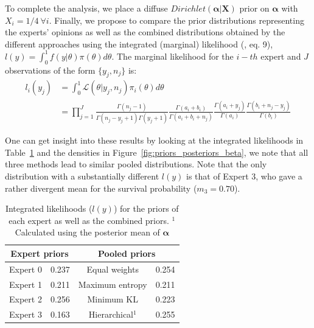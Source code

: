 \documentclass[a4paper, notitlepage, 10pt]{article}
\begin{document}

To complete the analysis, we place a diffuse $Dirichlet(\boldsymbol\alpha | \boldsymbol X)$ prior on $\boldsymbol\alpha$ with $X_i = 1/4 \: \forall i$.
Finally, we propose to compare the prior distributions representing the experts' opinions as well as the combined distributions obtained by the different approaches using the integrated (marginal) likelihood (\cite{raftery2007}, eq. 9), $l(y) = \int_{0}^{1}f(y|\theta)\pi(\theta)d\theta$.
The marginal likelihood for the $i-th$ expert and $J$ observations of the form $\{ y_j, n_j\}$ is:
\begin{align}
  \label{eq:marglike}
l_i(y_j) &= \int_{0}^{1}\mathcal{L}(\theta|y_j, n_j)\pi_i(\theta)d\theta\nonumber\\
 &= \prod_{j = 1}^{J}\frac{\Gamma(n_j-1)}{\Gamma(n_j-y_j + 1)\Gamma(y_j+1)}\frac{\Gamma(a_i + b_i)}{\Gamma(a_i + b_i + n_j)}\frac{\Gamma(a_i + y_j)}{\Gamma(a_i)}\frac{\Gamma(b_i + n_j - y_j) }{\Gamma(b_i)}
 \end{align}

One can get insight into these results by looking at the integrated likelihoods in Table~\ref{tab:marglikes} and the densities in Figure~\ref{fig:priors_posteriors_beta}, we note that all three methods lead  to similar pooled distributions.
Note that the only distribution with a substantially different $l(y)$ is that of Expert 3, who gave a rather divergent mean for the survival probability ($m_3=0.70$).

\begin{table}[ht]
\caption{Integrated likelihoods ($l(y)$) for the priors of each expert as well as the combined priors.
$^1$ Calculated using the posterior mean of $\boldsymbol\alpha$}
\centering
\begin{tabular}{cccc}
   \hline
   \multicolumn{2}{c}{Expert priors} &  \multicolumn{2}{c}{Pooled priors} \\
   \hline
   Expert 0 & 0.237 & Equal weights & 0.254\\
   Expert 1 & 0.211 & Maximum entropy & 0.211 \\
   Expert 2 & 0.256 & Minimum KL & 0.223\\ 
   Expert 3 & 0.163 & Hierarchical$^1$ & 0.255 \\
   \hline
\end{tabular}
\label{tab:marglikes}
\end{table}
\end{document}
